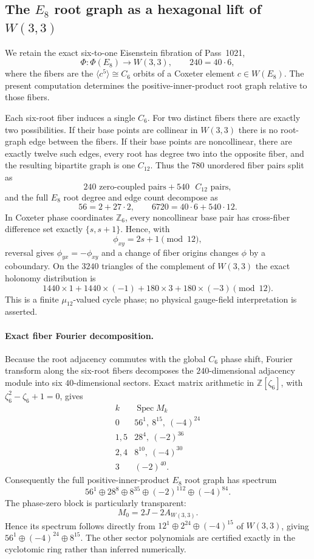 \subsection{The $E_8$ root graph as a hexagonal lift of $W(3,3)$}
\label{sec:pass7163-7170-e8-hexagonal-lift}

We retain the exact six-to-one Eisenstein fibration of Pass~1021,
\[
  \Phi:\Phi(E_8)\longrightarrow W(3,3),\qquad 240=40\cdot6,
\]
where the fibers are the $\langle c^5\rangle\cong C_6$ orbits of a Coxeter element $c\in W(E_8)$.  The present computation determines the positive-inner-product root graph relative to those fibers.

Each six-root fiber induces a single $C_6$.  For two distinct fibers there are exactly two possibilities.  If their base points are collinear in $W(3,3)$ there is no root-graph edge between the fibers.  If their base points are noncollinear, there are exactly twelve such edges, every root has degree two into the opposite fiber, and the resulting bipartite graph is one $C_{12}$.  Thus the $780$ unordered fiber pairs split as
\[
  \boxed{240\text{ zero-coupled pairs}+540\text{ }C_{12}\text{ pairs}},
\]
and the full $E_8$ root degree and edge count decompose as
\[
  \boxed{56=2+27\cdot2},\qquad
  \boxed{6720=40\cdot6+540\cdot12}.
\]
In Coxeter phase coordinates $\mathbb Z_6$, every noncollinear base pair has cross-fiber difference set exactly $\{s,s+1\}$.  Hence, with
\[
  \phi_{xy}=2s+1\pmod{12},
\]
reversal gives $\phi_{yx}=-\phi_{xy}$ and a change of fiber origins changes $\phi$ by a coboundary.  On the $3240$ triangles of the complement of $W(3,3)$ the exact holonomy distribution is
\[
  \boxed{1440\times1+1440\times(-1)+180\times3+180\times(-3)\pmod{12}}.
\]
This is a finite $\mu_{12}$-valued cycle phase; no physical gauge-field interpretation is asserted.

\paragraph{Exact fiber Fourier decomposition.}
Because the root adjacency commutes with the global $C_6$ phase shift, Fourier transform along the six-root fibers decomposes the $240$-dimensional adjacency module into six $40$-dimensional sectors.  Exact matrix arithmetic in $\mathbb Z[\zeta_6]$, with $\zeta_6^2-\zeta_6+1=0$, gives
\[
\begin{array}{c|l}
k&\operatorname{Spec}M_k\\ \hline
0&56^1,\ 8^{15},\ (-4)^{24}\\
1,5&28^4,\ (-2)^{36}\\
2,4&8^{10},\ (-4)^{30}\\
3&(-2)^{40}.
\end{array}
\]
Consequently the full positive-inner-product $E_8$ root graph has spectrum
\[
  \boxed{56^1\oplus28^8\oplus8^{35}\oplus(-2)^{112}\oplus(-4)^{84}}.
\]
The phase-zero block is particularly transparent:
\[
  \boxed{M_0=2J-2A_{W(3,3)}}.
\]
Hence its spectrum follows directly from $12^1\oplus2^{24}\oplus(-4)^{15}$ of $W(3,3)$, giving $56^1\oplus(-4)^{24}\oplus8^{15}$.  The other sector polynomials are certified exactly in the cyclotomic ring rather than inferred numerically.

